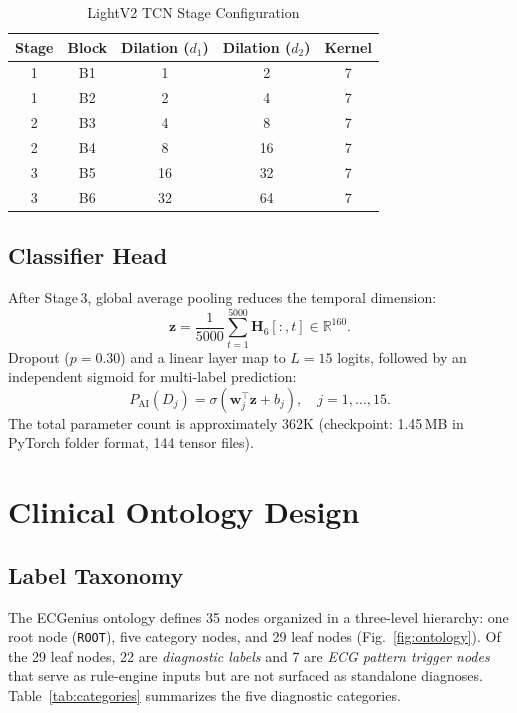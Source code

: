 \documentclass[journal]{IEEEtran}
\begin{document}
\begin{table}[!t]
\centering
\caption{LightV2 TCN Stage Configuration}
\label{tab:tcn}
\begin{tabular}{@{}ccccc@{}}
  \toprule
  Stage & Block & Dilation ($d_1$) & Dilation ($d_2$) & Kernel \\
  \midrule
  1 & B1 & 1  & 2  & 7 \\
  1 & B2 & 2  & 4  & 7 \\
  2 & B3 & 4  & 8  & 7 \\
  2 & B4 & 8  & 16 & 7 \\
  3 & B5 & 16 & 32 & 7 \\
  3 & B6 & 32 & 64 & 7 \\
  \bottomrule
\end{tabular}
\end{table}

\subsection{Classifier Head}

After Stage\,3, global average pooling reduces the temporal dimension:
\begin{equation}
  \mathbf{z} = \frac{1}{5000} \sum_{t=1}^{5000}
  \mathbf{H}_6[:, t] \in \mathbb{R}^{160}.
\end{equation}
Dropout ($p{=}0.30$) and a linear layer map to $L{=}15$ logits,
followed by an independent sigmoid for multi-label prediction:
\begin{equation}
  P_{\text{AI}}(D_j) = \sigma\!\left(\mathbf{w}_j^\top \mathbf{z}
  + b_j\right), \quad j = 1, \dots, 15.
\end{equation}
The total parameter count is approximately 362K (checkpoint: 1.45\,MB
in PyTorch folder format, 144 tensor files).

\section{Clinical Ontology Design}
\label{sec:ontology}

\subsection{Label Taxonomy}

The ECGenius ontology defines 35 nodes organized in a three-level
hierarchy: one root node (\texttt{ROOT}), five category nodes, and
29 leaf nodes (Fig.~\ref{fig:ontology}).
Of the 29 leaf nodes, 22 are \emph{diagnostic labels} and 7 are
\emph{ECG pattern trigger nodes} that serve as rule-engine
inputs but are not surfaced as standalone diagnoses.
Table~\ref{tab:categories} summarizes the five diagnostic categories.
\end{document}
